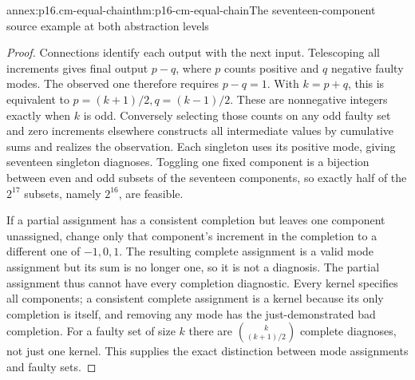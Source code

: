 \begin{annexitem}{annex:p16.cm-equal-chain}{thm:p16-cm-equal-chain}{The seventeen-component source example at both abstraction levels}
\begin{proof}
Connections identify each output with the next input. Telescoping all
increments gives final output \(p-q\), where \(p\) counts positive
and \(q\) negative faulty modes. The observed one therefore requires
\(p-q=1\). With \(k=p+q\), this is equivalent to
\(p=(k+1)/2,q=(k-1)/2\). These are nonnegative integers exactly when
\(k\) is odd. Conversely selecting those counts on any odd faulty set and
zero increments elsewhere constructs all intermediate values by cumulative
sums and realizes the observation. Each singleton uses its positive mode,
giving seventeen singleton diagnoses. Toggling one fixed component is a
bijection between even and odd subsets of the seventeen components, so
exactly half of the \(2^{17}\) subsets, namely \(2^{16}\), are feasible.

If a partial assignment has a consistent completion but leaves one component
unassigned, change only that component's increment in the completion to a
different one of \(-1,0,1\). The resulting complete assignment is a valid
mode assignment but its sum is no longer one, so it is not a diagnosis.
The partial assignment thus cannot have every completion diagnostic.
Every kernel specifies all components; a consistent complete assignment
is a kernel because its only completion is itself, and removing any mode
has the just-demonstrated bad completion. For a faulty set of size \(k\)
there are \(\binom{k}{(k+1)/2}\) complete diagnoses, not just one kernel.
This supplies the exact distinction between mode assignments and faulty sets.
\end{proof}
\end{annexitem}

